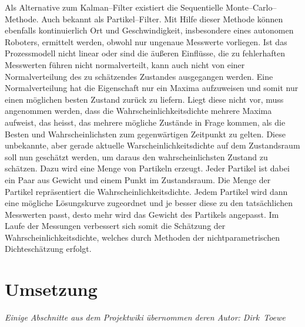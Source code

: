 Als Alternative zum Kalman--Filter existiert die Sequentielle Monte--Carlo--Methode. Auch bekannt als Partikel--Filter. Mit Hilfe dieser Methode können ebenfalls kontinuierlich Ort und Geschwindigkeit, insbesondere eines autonomen Roboters, ermittelt werden, obwohl nur ungenaue Messwerte vorliegen.
Ist das Prozessmodell nicht linear oder sind die äußeren Einflüsse, die zu fehlerhaften Messwerten führen nicht normalverteilt, kann auch nicht von einer Normalverteilung des zu schätzendes Zustandes ausgegangen werden. Eine Normalverteilung hat die Eigenschaft nur ein Maxima aufzuweisen und somit nur einen möglichen besten Zustand zurück zu liefern. Liegt diese nicht vor, muss angenommen werden, dass die Wahrscheinlichkeitsdichte mehrere Maxima aufweist, das heisst, das mehrere mögliche Zustände in Frage kommen, als die Besten und Wahrscheinlichsten zum gegenwärtigen Zeitpunkt zu gelten.
Diese unbekannte, aber gerade aktuelle Warscheinlichkeitsdichte auf dem Zustandsraum soll nun geschätzt werden, um daraus den wahrscheinlichsten Zustand zu schätzen. Dazu wird eine Menge von Partikeln erzeugt. Jeder Partikel ist dabei ein Paar aus Gewicht und einem Punkt im Zustandsraum. Die Menge der Partikel repräsentiert die Wahrscheinlichkeitsdichte.
Jedem Partikel wird dann eine mögliche Lösungskurve zugeordnet und je besser diese zu den tatsächlichen Messwerten passt, desto mehr wird das Gewicht des Partikels angepasst. Im Laufe der Messungen verbessert sich somit die Schätzung der Wahrscheinlichkeitsdichte, welches durch Methoden der nichtparametrischen Dichteschätzung erfolgt.\citep{rob3}

 
\section{Umsetzung}
\label{lokalisierung_umsetzung_sec}
\authorsection{\editorandreas}
\begin{flushright}\textit{Einige Abschnitte aus dem Projektwiki übernommen deren
Autor: Dirk~Toewe}\end{flushright}
